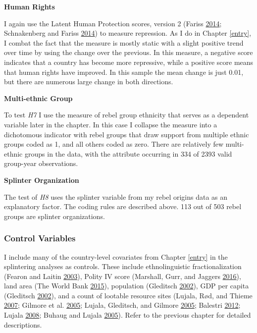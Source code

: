 \documentclass[12pt,]{book}
\theoremstyle{definition}
\theoremstyle{definition}
\theoremstyle{definition}
\theoremstyle{remark}
\begin{document}
\textbf{Human Rights}

I again use the Latent Human Protection scores, version 2 (Fariss
\protect\hyperlink{ref-Fariss2014}{2014}; Schnakenberg and Fariss
\protect\hyperlink{ref-Schnakenberg2014}{2014}) to measure repression.
As I do in Chapter \ref{entry}, I combat the fact that the measure is
mostly static with a slight positive trend over time by using the change
over the previous. In this measure, a negative score indicates that a
country has become more repressive, while a positive score means that
human rights have improved. In this sample the mean change is just 0.01,
but there are numerous large change in both directions.

\textbf{Multi-ethnic Group}

To test \emph{H7} I use the measure of rebel group ethnicity that serves
as a dependent variable later in the chapter. In this case I collapse
the measure into a dichotomous indicator with rebel groups that draw
support from multiple ethnic groups coded as 1, and all others coded as
zero. There are relatively few multi-ethnic groups in the data, with the
attribute occurring in 334 of 2393 valid group-year observations.

\textbf{Splinter Organization}

The test of \emph{H8} uses the splinter variable from my rebel origins
data as an explanatory factor. The coding rules are described above. 113
out of 503 rebel groups are splinter organizations.

\hypertarget{control-variables-2}{%
\subsubsection*{Control Variables}\label{control-variables-2}}

I include many of the country-level covariates from Chapter \ref{entry}
in the splintering analyses as controls. These include ethnolinguistic
fractionalization (Fearon and Laitin
\protect\hyperlink{ref-fearonlaitin03}{2003}), Polity IV score
(Marshall, Gurr, and Jaggers
\protect\hyperlink{ref-Marshall2016}{2016}), land area (The World Bank
\protect\hyperlink{ref-WorldBank2015}{2015}), population (Gleditsch
\protect\hyperlink{ref-Gleditsch2002b}{2002}), GDP per capita (Gleditsch
\protect\hyperlink{ref-Gleditsch2002b}{2002}), and a count of lootable
resource sites (Lujala, Rød, and Thieme
\protect\hyperlink{ref-Lujala2007}{2007}; Gilmore et al.
\protect\hyperlink{ref-Gilmore2007}{2005}; Lujala, Gleditsch, and
Gilmore \protect\hyperlink{ref-Lujala2005}{2005}; Balestri
\protect\hyperlink{ref-Balestri2012}{2012}; Lujala
\protect\hyperlink{ref-Lujala2008}{2008}; Buhaug and Lujala
\protect\hyperlink{ref-Buhaug2005}{2005}). Refer to the previous chapter
for detailed descriptions.
\end{document}
